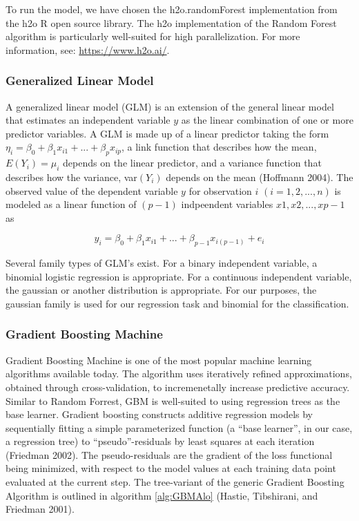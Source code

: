 \documentclass[12pt,]{article}
\begin{document}
To run the model, we have chosen the h2o.randomForest implementation
from the h2o R open source library. The h2o implementation of the Random
Forest algorithm is particularly well-suited for high parallelization.
For more information, see: \url{https://www.h2o.ai/}.

\hypertarget{generalized-linear-model}{%
\subsubsection{Generalized Linear
Model}\label{generalized-linear-model}}

A generalized linear model (GLM) is an extension of the general linear
model that estimates an independent variable \(y\) as the linear
combination of one or more predictor variables. A GLM is made up of a
linear predictor taking the form
\(\eta_i = \beta_0+\beta_1x_{i1}+...+\beta_{p}x_{ip}\), a link function
that describes how the mean, \(E(Y_i)=\mu_i\) depends on the linear
predictor, and a variance function that describes how the variance,
var\((Y_i)\) depends on the mean (Hoffmann 2004). The observed value of
the dependent variable \(y\) for observation \(i\)
\((i = 1, 2, ..., n)\) is modeled as a linear function of \((p - 1)\)
indpeendent variables \(x1, x2,... ,xp-1\) as

\[
y_i = \beta_0+\beta_1x_{i1}+...+\beta_{p-1}x_{i(p-1)}+e_i
\]

Several family types of GLM's exist. For a binary independent variable,
a binomial logistic regression is appropriate. For a continuous
independent variable, the gaussian or another distribution is
appropriate. For our purposes, the gaussian family is used for our
regression task and binomial for the classification.

\hypertarget{gradient-boosting-machine}{%
\subsubsection{Gradient Boosting
Machine}\label{gradient-boosting-machine}}

Gradient Boosting Machine is one of the most popular machine learning
algorithms available today. The algorithm uses iteratively refined
approximations, obtained through cross-validation, to incremenetally
increase predictive accuracy. Similar to Random Forrest, GBM is
well-suited to using regression trees as the base learner. Gradient
boosting constructs additive regression models by sequentially fitting a
simple parameterized function (a ``base learner'', in our case, a
regression tree) to ``pseudo''-residuals by least squares at each
iteration (Friedman 2002). The pseudo-residuals are the gradient of the
loss functional being minimized, with respect to the model values at
each training data point evaluated at the current step. The tree-variant
of the generic Gradient Boosting Algorithm is outlined in algorithm
\ref{alg:GBMAlo} (Hastie, Tibshirani, and Friedman 2001).
\end{document}
